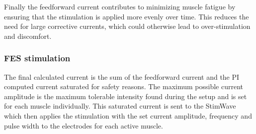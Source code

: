 Finally the feedforward current contributes to minimizing muscle fatigue by ensuring that the stimulation is applied more evenly over time. This reduces the need for large corrective currents, which could otherwise lead to over-stimulation and discomfort.


\subsubsection{FES stimulation}
The final calculated current is the sum of the feedforward current and the PI computed current saturated for safety reasons. The maximum possible current amplitude is the maximum tolerable intensity found during the setup and is set for each muscle individually. This saturated current is sent to the StimWave which then applies the stimulation with the set current amplitude, frequency and pulse width to the electrodes for each active muscle.


























 





































